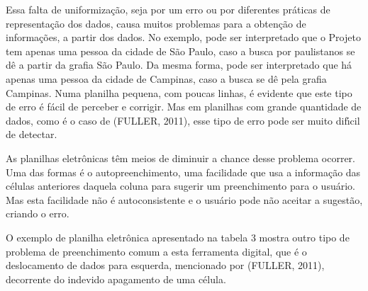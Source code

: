 \documentclass[
12pt,		%
openright,	%
twoside,  %
a4paper,			%
chapter=TITLE,		%
english,			%
french,				%
spanish,			%
brazil				%
]{USPSC-classe/USPSC}
\begin{document}
Essa falta de uniformiza\c{c}\~ao, seja por um erro ou por diferentes pr\'aticas de representa\c{c}\~ao dos dados, causa muitos problemas para a obten\c{c}\~ao de informa\c{c}\~oes, a partir dos dados. No exemplo, pode ser interpretado que o Projeto tem apenas uma pessoa da cidade de S\~ao Paulo, caso a busca por paulistanos se d\^e a partir da grafia \textquotedbl S\~ao Paulo\textquotedbl . Da mesma forma, pode ser interpretado que h\'a apenas uma pessoa da cidade de Campinas, caso a busca se d\^e pela grafia \textquotedbl Campinas\textquotedbl . Numa planilha pequena, com poucas linhas, \'e evidente que este tipo de erro \'e f\'acil de perceber e corrigir. Mas em planilhas com grande quantidade de dados, como \'e o caso de (FULLER, 2011), esse tipo de erro pode ser muito dif\'{\i}cil de detectar.

















As planilhas eletr\^onicas t\^em meios de diminuir a chance desse problema ocorrer. Uma das formas \'e o autopreenchimento, uma facilidade que usa a informa\c{c}\~ao das c\'elulas anteriores daquela coluna para sugerir um preenchimento para o usu\'ario. Mas esta facilidade n\~ao \'e autoconsistente e o usu\'ario pode n\~ao aceitar a sugest\~ao, criando o erro.

















O exemplo de planilha eletr\^onica apresentado na tabela 3 mostra outro tipo de problema de preenchimento comum a esta ferramenta digital, que \'e o deslocamento de dados para esquerda,  mencionado por (FULLER, 2011), decorrente do indevido apagamento de uma c\'elula.
\end{document}
